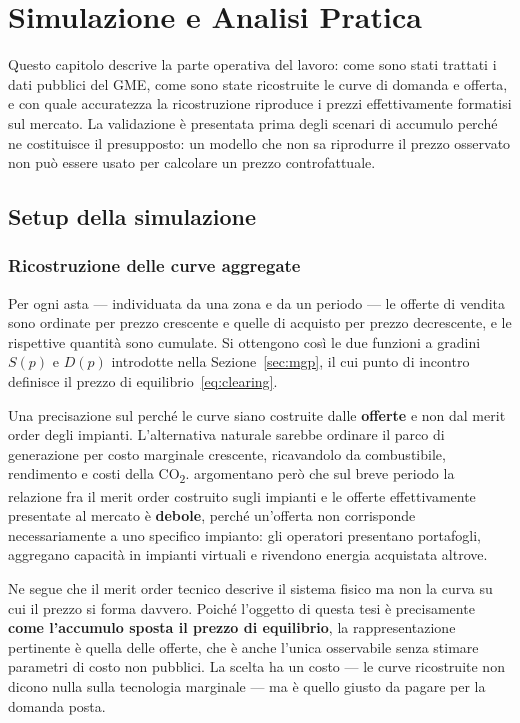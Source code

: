 \chapter{Simulazione e Analisi Pratica}
\label{cap:simulazione}

Questo capitolo descrive la parte operativa del lavoro: come sono stati trattati i dati
pubblici del GME, come sono state ricostruite le curve di domanda e offerta, e con quale
accuratezza la ricostruzione riproduce i prezzi effettivamente formatisi sul mercato. La
validazione \`e presentata prima degli scenari di accumulo perch\'e ne costituisce il
presupposto: un modello che non sa riprodurre il prezzo osservato non pu\`o essere usato per
calcolare un prezzo controfattuale.

\section{Setup della simulazione}
\label{sec:setup}

\subsection{Ricostruzione delle curve aggregate}

Per ogni asta — individuata da una zona e da un periodo — le offerte di vendita sono ordinate
per prezzo crescente e quelle di acquisto per prezzo decrescente, e le rispettive quantit\`a
sono cumulate. Si ottengono cos\`i le due funzioni a gradini $S(p)$ e $D(p)$ introdotte nella
Sezione~\ref{sec:mgp}, il cui punto di incontro definisce il prezzo di
equilibrio~\eqref{eq:clearing}.

Una precisazione sul perch\'e le curve siano costruite dalle \textbf{offerte} e non dal merit
order degli impianti. L'alternativa naturale sarebbe ordinare il parco di generazione per costo
marginale crescente, ricavandolo da combustibile, rendimento e costi della CO\textsubscript{2}.
\textcite{veenstra2025profitability} argomentano per\`o che sul breve periodo la relazione fra il
merit order costruito sugli impianti e le offerte effettivamente presentate al mercato \`e
\textbf{debole}, perch\'e un'offerta non corrisponde necessariamente a uno specifico impianto:
gli operatori presentano portafogli, aggregano capacit\`a in impianti virtuali e rivendono
energia acquistata altrove.

Ne segue che il merit order tecnico descrive il sistema fisico ma non la curva su cui il prezzo
si forma davvero. Poich\'e l'oggetto di questa tesi \`e precisamente \textbf{come l'accumulo
sposta il prezzo di equilibrio}, la rappresentazione pertinente \`e quella delle offerte, che
\`e anche l'unica osservabile senza stimare parametri di costo non pubblici. La scelta ha un
costo — le curve ricostruite non dicono nulla sulla tecnologia marginale — ma \`e quello giusto
da pagare per la domanda posta.

